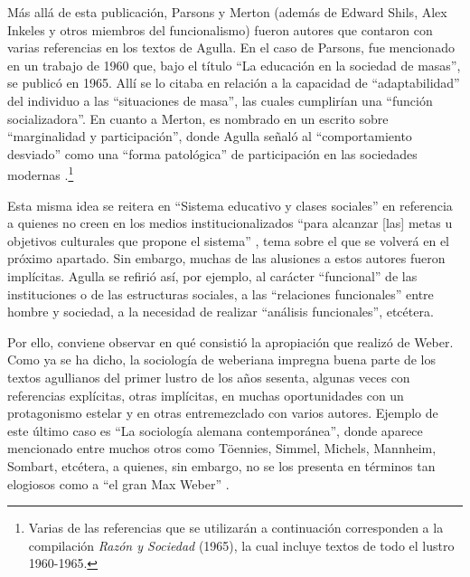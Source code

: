 Más allá de esta publicación, Parsons y Merton (además de Edward Shils, Alex Inkeles y otros miembros del funcionalismo) fueron autores que contaron con varias referencias en los textos de Agulla. En el caso de Parsons, fue mencionado en un trabajo de 1960 que, bajo el título \enquote{La educación en la sociedad de masas}, se publicó en 1965. Allí se lo citaba en relación a la capacidad de \enquote{adaptabilidad} del individuo a las \enquote{situaciones de masa}, las cuales cumplirían una \enquote{función socializadora}. En cuanto a Merton, es nombrado en un escrito sobre \enquote{marginalidad y participación}, donde Agulla señaló al \enquote{comportamiento desviado} como una \enquote{forma patológica} de participación en las sociedades modernas \parencite{1641-AGULLA1965}.\footnote{Varias de las referencias que se utilizarán a continuación corresponden a la compilación \emph{Razón y Sociedad} (1965), la cual incluye textos de todo el lustro 1960-1965.}

Esta misma idea se reitera en \enquote{Sistema educativo y clases sociales} en referencia a quienes no creen en los medios institucionalizados \enquote{para alcanzar [las] metas u objetivos culturales que propone el sistema} \parencite[33]{1642-AGULLA1964}, tema sobre el que se volverá en el próximo apartado. Sin embargo, muchas de las alusiones a estos autores fueron implícitas. Agulla se refirió así, por ejemplo, al carácter \enquote{funcional} de las instituciones o de las estructuras sociales, a las \enquote{relaciones funcionales} entre hombre y sociedad, a la necesidad de realizar \enquote{análisis funcionales}, etcétera.

Por ello, conviene observar en qué consistió la apropiación que realizó de Weber. Como ya se ha dicho, la sociología de weberiana impregna buena parte de los textos agullianos del primer lustro de los años sesenta, algunas veces con referencias explícitas, otras implícitas, en muchas oportunidades con un protagonismo estelar y en otras entremezclado con varios autores. Ejemplo de este último caso es \enquote{La sociología alemana contemporánea}, donde aparece mencionado entre muchos otros como Töennies, Simmel, Michels, Mannheim, Sombart, etcétera, a quienes, sin embargo, no se los presenta en términos tan elogiosos como a \enquote{el gran Max Weber} \parencite[90]{1643-AGULLA1963}.


